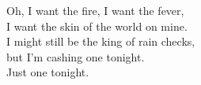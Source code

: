 \begin{lyrics}
Oh, I want the fire, I want the fever,\\
I want the skin of the world on mine.\\
I might still be the king of rain checks,\\
but I’m cashing one tonight.\\
Just one tonight.
\end{lyrics}

